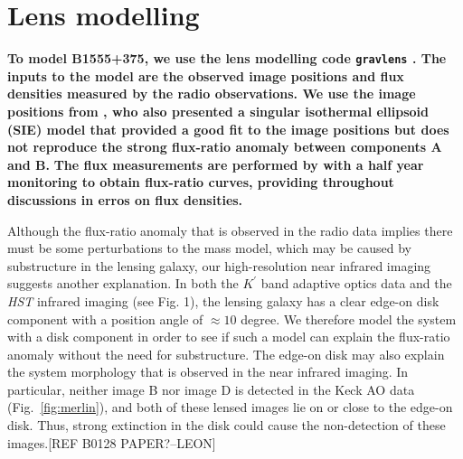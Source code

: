 \documentclass[useAMS,usenatbib]{mn2e}
\begin{document}

\section{Lens modelling}

\textbf{To model B1555+375, we use the lens modelling code {\tt gravlens} \citep{Kee01}.  
The inputs to the model are the observed image
positions and flux densities measured by the radio observations.
We use the image positions from \citet{Marlow99}, who also presented a singular isothermal ellipsoid
(SIE) model that provided a good fit to the image positions but
does not reproduce the strong flux-ratio anomaly between components A
and B.}  %
\textbf{The flux measurements are performed by \citet{K03} with a half year monitoring to obtain flux-ratio curves, providing throughout discussions in erros on flux densities.}

Although the flux-ratio anomaly that is observed in the radio data implies there must be some perturbations to the mass model, which may be
caused by substructure in the lensing galaxy, our high-resolution near
infrared imaging suggests another explanation.  In both the $K^\prime$
band adaptive optics data and the \textit{HST} infrared imaging (see 
Fig. 1), the lensing galaxy has a clear edge-on disk component with a
position angle of $\approx 10$ degree.  We therefore model the system
with a disk component in order to see if such a model can explain the
flux-ratio anomaly without the need for substructure.  The edge-on
disk may also explain the system morphology that is observed in the
near infrared imaging.  In particular, neither image B nor image D is
detected in the Keck AO data (Fig.~\ref{fig:merlin}), and both of
these lensed images lie on or close to the edge-on disk.  Thus, strong
extinction in the disk could cause the non-detection of these
images.[REF B0128 PAPER?--LEON]
\end{document}
